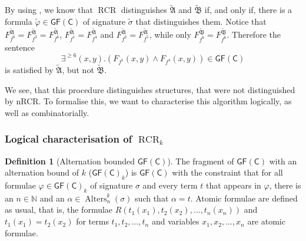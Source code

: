 \documentclass[a4paper,11pt,DIV=15]{scrartcl} %
\renewcommand{\phi}{\varphi}
\theoremstyle{plain}
\theoremstyle{definition}
\newtheorem{definition}[theorem]{Definition}
\newcommand{\GFC}{\mathsf{GF}(\mathsf{C})}
\newcommand{\RCR}{\operatorname{RCR}}
\begin{document}
By using \cite{scheidt2025ColorRefinement}, we know that $\RCR$ distinguishes $\widetilde{\mathfrak A}$ and $\widetilde{\mathfrak B}$ if, and only if, there is a formula $\widetilde{\phi}\in\GFC$ of signature $\widetilde{\sigma}$ that distinguishes them.
Notice that $F_{f^0}^{\widetilde{\mathfrak A}}=F_{f^3}^{\widetilde{\mathfrak A}}=F_{f^6}^{\widetilde{\mathfrak A}}$, $F_{f^1}^{\widetilde{\mathfrak A}}=F_{f^4}^{\widetilde{\mathfrak A}}$ and $F_{f^2}^{\widetilde{\mathfrak A}}=F_{f^5}^{\widetilde{\mathfrak A}}$, while only $F_{f^0}^{\widetilde{\mathfrak B}}=F_{f^6}^{\widetilde{\mathfrak B}}$.
Therefore the sentence 
$$\exists^{\geq 6}(x,y).\left(F_{f^1}(x,y) \land F_{f^4}(x,y)\right)\in \GFC$$ 
is satisfied by $\widetilde{\mathfrak A}$, but not $\widetilde{\mathfrak B}$.

We see, that this procedure distinguishes structures, that were not distinguished by nRCR.
To formalise this, we want to characterise this algorithm logically, as well as combinatorially.

\subsubsection{Logical characterisation of $\RCR_k$}

\begin{definition}[Alternation bounded $\GFC$]
	The fragment of $\GFC$ with an alternation bound of $k$ ($\GFC_k$) is $\GFC$ with the constraint that for all formulae $\phi\in\GFC_k$ of signature $\sigma$ and every term $t$ that appears in $\phi$, there is an $n\in \mathbb{N}$ and an $\alpha\in \operatorname{Alters}_n^k(\sigma)$ such that $\alpha=t$.
	Atomic formulae are defined as usual, that is, the formulae $R(t_1(x_1),t_2(x_2),\dots,t_n(x_n))$ and $t_1(x_1)=t_2(x_2)$ for terms $t_1,t_2,\dots,t_n$ and variables $x_1,x_2,\dots,x_n$ are atomic formulae.
\end{definition}
\end{document}
